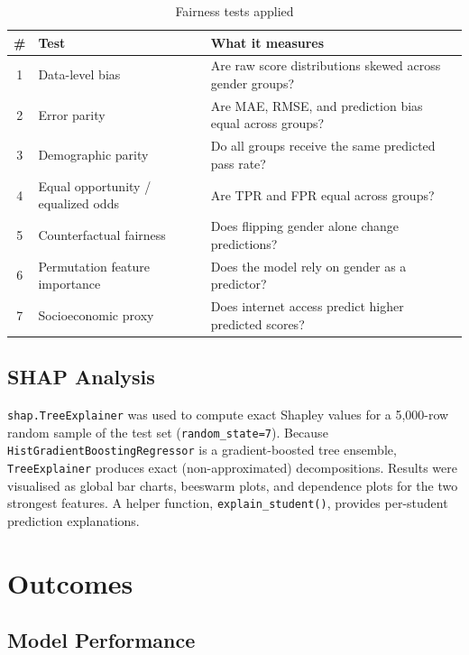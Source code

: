 \documentclass[12pt, letterpaper]{article}
\begin{document}
\begin{table}[H]
\centering
\caption{Fairness tests applied}
\begin{tabular}{@{}clp{8cm}@{}}
\toprule
\textbf{\#} & \textbf{Test} & \textbf{What it measures} \\
\midrule
1 & Data-level bias         & Are raw score distributions skewed across gender groups? \\
2 & Error parity            & Are MAE, RMSE, and prediction bias equal across groups? \\
3 & Demographic parity      & Do all groups receive the same predicted pass rate? \\
4 & Equal opportunity / equalized odds & Are TPR and FPR equal across groups? \\
5 & Counterfactual fairness & Does flipping gender alone change predictions? \\
6 & Permutation feature importance & Does the model rely on gender as a predictor? \\
7 & Socioeconomic proxy     & Does internet access predict higher predicted scores? \\
\bottomrule
\end{tabular}
\end{table}

\subsection{SHAP Analysis}

\texttt{shap.TreeExplainer} was used to compute exact Shapley values for a
5,000-row random sample of the test set (\texttt{random\_state=7}). Because
\texttt{HistGradientBoostingRegressor} is a gradient-boosted tree ensemble,
\texttt{TreeExplainer} produces exact (non-approximated) decompositions.
Results were visualised as global bar charts, beeswarm plots, and dependence
plots for the two strongest features. A helper function,
\texttt{explain\_student()}, provides per-student prediction explanations.

\section{Outcomes}

\subsection{Model Performance}
\end{document}
